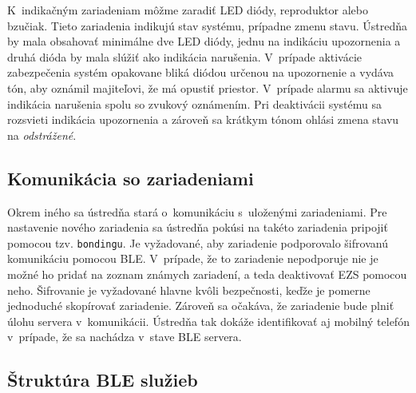 K~indikačným zariadeniam môžme zaradiť LED diódy, reproduktor alebo bzučiak. Tieto zariadenia indikujú stav systému, prípadne zmenu stavu. Ústredňa by mala obsahovať minimálne dve LED diódy, jednu na indikáciu upozornenia a druhá dióda by mala slúžiť ako indikácia narušenia. V~prípade aktivácie zabezpečenia systém opakovane bliká diódou určenou na upozornenie a vydáva tón, aby oznámil majiteľovi, že má opustiť priestor. V~prípade alarmu sa aktivuje indikácia narušenia spolu so zvukový oznámením. Pri deaktivácii systému sa rozsvieti indikácia upozornenia a zároveň sa krátkym tónom ohlási zmena stavu na \textit{odstrážené}.

\subsection{Komunikácia so zariadeniami}

Okrem iného sa ústredňa stará o~komunikáciu s~uloženými zariadeniami. Pre nastavenie nového zariadenia sa ústredňa pokúsi na takéto zariadenia pripojiť pomocou tzv. \texttt{bondingu}. Je vyžadované, aby zariadenie podporovalo šifrovanú komunikáciu pomocou BLE. V~prípade, že to zariadenie nepodporuje nie je možné ho pridať na zoznam známych zariadení, a teda deaktivovať EZS pomocou neho. Šifrovanie je vyžadované hlavne kvôli bezpečnosti, keďže je pomerne jednoduché skopírovať zariadenie. Zároveň sa očakáva, že zariadenie bude plniť úlohu servera v~komunikácii. Ústredňa tak dokáže identifikovať aj mobilný telefón v~prípade, že sa nachádza v~stave BLE servera.

\subsection{Štruktúra BLE služieb}\label{sec:BLE_struc}


